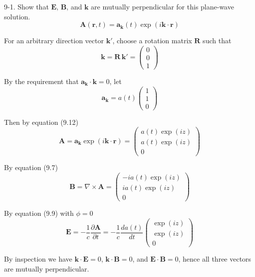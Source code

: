 \documentclass[12pt]{article}
\begin{document}
9-1.
Show that $\mathbf E$, $\mathbf B$, and $\mathbf k$ are
mutually perpendicular for this plane-wave solution.
\begin{equation*}
\mathbf A(\mathbf r,t)=\mathbf a_{\mathbf k}(t)
\exp(i\mathbf k\cdot\mathbf r)
\tag{9.12}
\end{equation*}

For an arbitrary direction vector $\mathbf k'$,
choose a rotation matrix $\mathbf R$ such that
\begin{equation*}
\mathbf k=\mathbf R\,\mathbf k'=\begin{pmatrix}0\\0\\1\end{pmatrix}
\end{equation*}

By the requirement that $\mathbf a_{\mathbf k}\cdot\mathbf k=0$, let
\begin{equation*}
\mathbf a_{\mathbf k}=a(t)\begin{pmatrix}1\\1\\0\end{pmatrix}
\end{equation*}

Then by equation (9.12)
\begin{equation*}
\mathbf A=\mathbf a_{\mathbf k}\exp(i\mathbf k\cdot\mathbf r)
=\begin{pmatrix}
a(t)\exp(iz)
\\[1ex]
a(t)\exp(iz)
\\[1ex]
0
\end{pmatrix}
\end{equation*}

By equation (9.7)
\begin{equation*}
\mathbf B=\nabla\times\mathbf A=
\begin{pmatrix}
-ia(t)\exp(iz)
\\[1ex]
ia(t)\exp(iz)
\\[1ex]
0
\end{pmatrix}
\end{equation*}

By equation (9.9) with $\phi=0$
\begin{equation*}
\mathbf E=-\frac{1}{c}\frac{\partial\mathbf A}{\partial t}=
-\frac{1}{c}\frac{da(t)}{dt}
\begin{pmatrix}
\exp(iz)
\\[1ex]
\exp(iz)
\\[1ex]
0
\end{pmatrix}
\end{equation*}

By inspection we have $\mathbf k\cdot\mathbf E=0$, $\mathbf k\cdot\mathbf B=0$,
and $\mathbf E\cdot\mathbf B=0$, hence all three vectors are mutually perpendicular.
\end{document}
